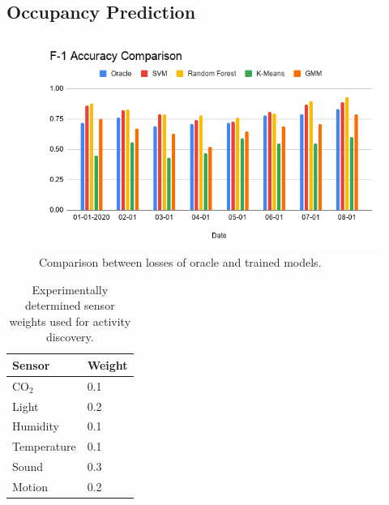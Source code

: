 \documentclass[conference]{IEEEtran}
\begin{document}
\subsection{Occupancy Prediction}




\begin{figure}
\centering
  \includegraphics[width=1\linewidth]{./img/f1Accuracy.png}
  \caption{ Comparison between losses of oracle and trained models. }
  \label{fig:f1Accuracy}
\end{figure}


\begin{table}[]
\caption{Experimentally determined sensor weights used for activity discovery. }
\label{table:sensorweights}
\centering
\begin{tabular}{|l|l|}
\hline
Sensor      & Weight \\ \hline
CO$_2$      & 0.1    \\ \hline
Light       & 0.2    \\ \hline
Humidity    & 0.1    \\ \hline
Temperature & 0.1    \\ \hline
Sound       & 0.3    \\ \hline
Motion      & 0.2    \\ \hline
\end{tabular}
\end{table}
\end{document}
